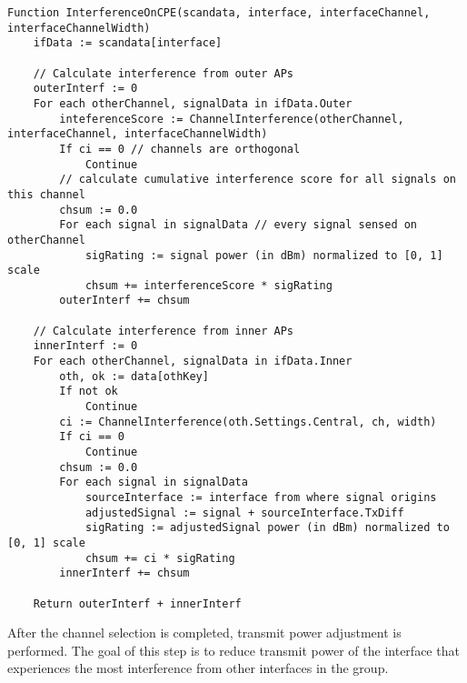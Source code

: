\begin{lstlisting}[language={Pseudo}, caption=OnIfaceInterference() function, label=lst:interf_on_cpe]
Function InterferenceOnCPE(scandata, interface, interfaceChannel, interfaceChannelWidth)
    ifData := scandata[interface]

    // Calculate interference from outer APs
    outerInterf := 0
    For each otherChannel, signalData in ifData.Outer
        inteferenceScore := ChannelInterference(otherChannel, interfaceChannel, interfaceChannelWidth)
        If ci == 0 // channels are orthogonal
            Continue
        // calculate cumulative interference score for all signals on this channel
        chsum := 0.0
        For each signal in signalData // every signal sensed on otherChannel
            sigRating := signal power (in dBm) normalized to [0, 1] scale
            chsum += interferenceScore * sigRating
        outerInterf += chsum

    // Calculate interference from inner APs
    innerInterf := 0
    For each otherChannel, signalData in ifData.Inner
        oth, ok := data[othKey]
        If not ok
            Continue
        ci := ChannelInterference(oth.Settings.Central, ch, width)
        If ci == 0
            Continue
        chsum := 0.0
        For each signal in signalData
            sourceInterface := interface from where signal origins
            adjustedSignal := signal + sourceInterface.TxDiff
            sigRating := adjustedSignal power (in dBm) normalized to [0, 1] scale
            chsum += ci * sigRating
        innerInterf += chsum

    Return outerInterf + innerInterf
\end{lstlisting}

After the channel selection is completed, transmit power adjustment is performed. The goal of this step is to reduce transmit power of the interface that experiences the most interference from other interfaces in the group.

